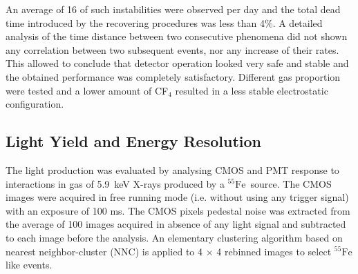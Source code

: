 \documentclass[physics,article,submit,moreauthors,pdftex]{Definitions/mdpi}
\newcommand{\fe}{\ensuremath{^{55}\textrm{Fe}}\xspace}
\begin{document}
An average of 16 of such instabilities were observed per day and the total dead time introduced by the recovering procedures was less than 4$\%$. A detailed analysis of the time distance between two consecutive phenomena did not shown any correlation between two subsequent events, nor any increase of their rates. This allowed to conclude that detector operation looked very safe and stable and the obtained performance was completely satisfactory. Different gas proportion were tested and a lower amount of CF$_4$ resulted in a less stable electrostatic configuration. 





\subsection{Light Yield and Energy Resolution}\label{sec:yield}

The light production was evaluated by analysing CMOS and PMT response to interactions in gas of 5.9~keV X-rays produced by a \fe~source. The CMOS images were acquired in free running mode (i.e. without using any trigger signal) with an exposure of 100 ms. The CMOS pixels pedestal noise was extracted from the average of 100 images acquired in absence of any light signal and subtracted to each image before the analysis. An elementary clustering algorithm based on nearest neighbor-cluster (NNC) is applied to 4 $\times$ 4 rebinned images to select \fe\-like events.
\end{document}
